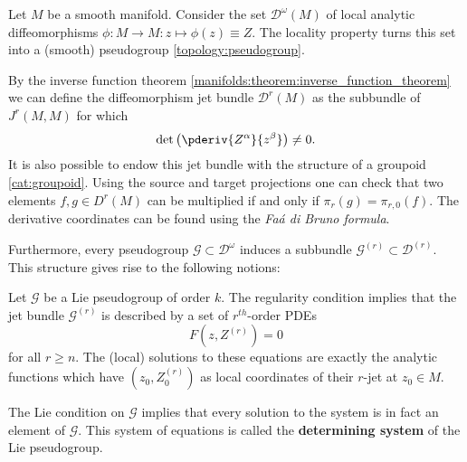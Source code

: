     \begin{example}
        Let $M$ be a smooth manifold. Consider the set $\mathcal{D}^\omega(M)$ of local analytic diffeomorphisms $\phi:M\rightarrow M:z\mapsto\phi(z)\equiv Z$. The locality property turns this set into a (smooth) pseudogroup \ref{topology:pseudogroup}.

        By the inverse function theorem \ref{manifolds:theorem:inverse_function_theorem} we can define the diffeomorphism jet bundle $\mathcal{D}^r(M)$ as the subbundle of $J^r(M, M)$ for which \[\det\left(\pderiv{Z^\alpha}{z^\beta}\right)\neq0.\] It is also possible to endow this jet bundle with the structure of a groupoid \ref{cat:groupoid}. Using the source and target projections one can check that two elements $f,g\in D^r(M)$ can be multiplied if and only if $\pi_r(g) = \pi_{r,0}(f)$. The derivative coordinates can be found using the \textit{Fa\'a di Bruno formula}.

        Furthermore, every pseudogroup $\mathcal{G}\subset\mathcal{D}^\omega$ induces a subbundle $\mathcal{G}^{(r)}\subset\mathcal{D}^{(r)}$. This structure gives rise to the following notions:
    \end{example}
    \begin{property}
        Let $\mathcal{G}$ be a Lie pseudogroup of order $k$. The regularity condition implies that the jet bundle $\mathcal{G}^{(r)}$ is described by a set of $r^{th}$-order PDEs \[F\left(z, Z^{(r)}\right) = 0\] for all $r\geq n$. The (local) solutions to these equations are exactly the analytic functions which have $(z_0, Z^{(r)}_0)$ as local coordinates of their $r$-jet at $z_0\in M$.

        The Lie condition on $\mathcal{G}$ implies that every solution to the system is in fact an element of $\mathcal{G}$. This system of equations is called the \textbf{determining system} of the Lie pseudogroup.
    \end{property}

